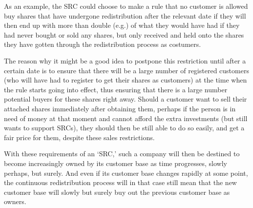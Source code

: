 \documentclass{article}
\begin{document}
As an example, the SRC could choose to make a rule that no customer is allowed buy shares that have undergone redistribution after the relevant date if they will then end up with more than double (e.g.) of what they would have had if they had never bought or sold any shares, but only received and held onto the shares they have gotten through the redistribution process as costumers. 

The reason why it might be a good idea to postpone this restriction until after a certain date is to ensure that there will be a large number of registered customers (who will have had to register to get their shares as customers) at the time when the rule starts going into effect, thus ensuring that there is a large number potential buyers for these shares right away. Should a customer want to sell their attached shares immediately after obtaining them, perhaps if the person is in need of money at that moment and cannot afford the extra investments (but still wants to support SRCs), they should then be still able to do so easily, and get a fair price for them, despite these sales restrictions.
 

With these requirements of an `SRC,' such a company will then be destined to become increasingly owned by its customer base as time progresses, slowly perhaps, but surely. And even if its customer base changes rapidly at some point, the continuous redistribution process will in that case still mean that the new customer base will slowly but surely buy out the previous customer base as owners. 
\end{document}
